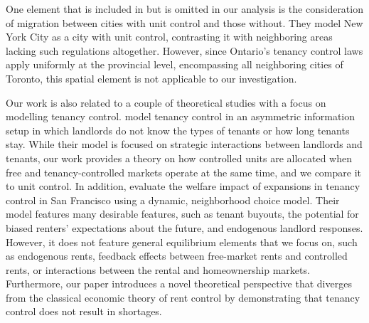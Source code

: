 \documentclass[parskip=full]{article}
\begin{document}
One element that is included in \citet{fmn-2023} but is omitted in our analysis is the consideration of migration between cities with unit control and those without. They model New York City as a city with unit control, contrasting it with neighboring areas lacking such regulations altogether. However, since Ontario's tenancy control laws apply uniformly at the provincial level, encompassing all neighboring cities of Toronto, this spatial element is not applicable to our investigation.

Our work is also related to a couple of theoretical studies with a focus on modelling tenancy control. \citet{be-2000} model tenancy control in an asymmetric information setup in which landlords do not know the types of tenants or how long tenants stay. While their model is focused on strategic interactions between landlords and tenants, our work provides a theory on how controlled units are allocated when free and tenancy-controlled markets operate at the same time, and we compare it to unit control. In addition, \citet{diamond-2019} evaluate the welfare impact of expansions in tenancy control in San Francisco using a dynamic, neighborhood choice model. Their model features many desirable features, such as tenant buyouts, the potential for biased renters' expectations about the future, and endogenous landlord responses. However, it does not feature general equilibrium elements that we focus on, such as endogenous rents, feedback effects between free-market rents and controlled rents, or interactions between the rental and homeownership markets. Furthermore, our paper introduces a novel theoretical perspective that diverges from the classical economic theory of rent control by demonstrating that tenancy control does not result in shortages.
\end{document}
